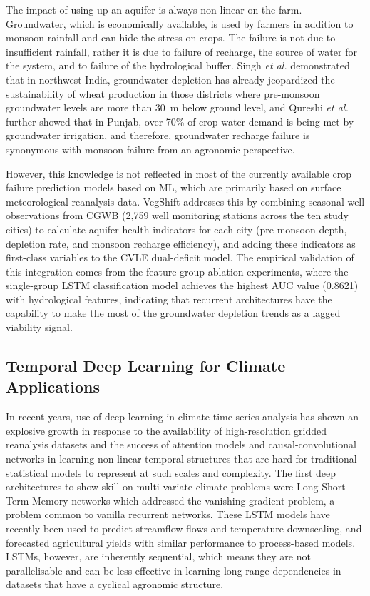 \documentclass{ieeeaccess}
\begin{document}
The impact of using up an aquifer is always non-linear on the farm. Groundwater, which is economically available, is used by farmers in addition to monsoon rainfall and can hide the stress on crops. The failure is not due to insufficient rainfall, rather it is due to failure of recharge, the source of water for the system, and to failure of the hydrological buffer. Singh \textit{et al.} \cite{singh2009} demonstrated that in northwest India, groundwater depletion has already jeopardized the sustainability of wheat production in those districts where pre-monsoon groundwater levels are more than 30~m below ground level, and Qureshi \textit{et al.} \cite{qureshi2010} further showed that in Punjab, over 70\% of crop water demand is being met by groundwater irrigation, and therefore, groundwater recharge failure is synonymous with monsoon failure from an agronomic perspective.

However, this knowledge is not reflected in most of the currently available crop failure prediction models based on ML, which are primarily based on surface meteorological reanalysis data. VegShift addresses this by combining seasonal well observations from CGWB (2,759 well monitoring stations across the ten study cities) to calculate aquifer health indicators for each city (pre-monsoon depth, depletion rate, and monsoon recharge efficiency), and adding these indicators as first-class variables to the CVLE dual-deficit model. The empirical validation of this integration comes from the feature group ablation experiments, where the single-group LSTM classification model achieves the highest AUC value (0.8621) with hydrological features, indicating that recurrent architectures have the capability to make the most of the groundwater depletion trends as a lagged viability signal.

\subsection{Temporal Deep Learning for Climate Applications}
In recent years, use of deep learning in climate time-series analysis has shown an explosive growth in response to the availability of high-resolution gridded reanalysis datasets and the success of attention models and causal-convolutional networks in learning non-linear temporal structures that are hard for traditional statistical models to represent at such scales and complexity. The first deep architectures to show skill on multi-variate climate problems were Long Short-Term Memory networks \cite{hochreiter1997} which addressed the vanishing gradient problem, a problem common to vanilla recurrent networks. These LSTM models have recently been used to predict streamflow flows \cite{kratzert2018} and temperature downscaling, and forecasted agricultural yields with similar performance to process-based models. LSTMs, however, are inherently sequential, which means they are not parallelisable and can be less effective in learning long-range dependencies in datasets that have a cyclical agronomic structure.
\end{document}
